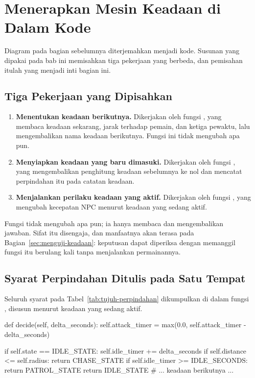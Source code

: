 \section{Menerapkan Mesin Keadaan di Dalam Kode}
\label{sec:menerapkan-fsm}

Diagram pada bagian sebelumnya diterjemahkan menjadi kode. Susunan yang dipakai
pada bab ini memisahkan tiga pekerjaan yang berbeda, dan pemisahan itulah yang
menjadi inti bagian ini.

\subsection{Tiga Pekerjaan yang Dipisahkan}

\begin{enumerate}
  \item \textbf{Menentukan keadaan berikutnya.} Dikerjakan oleh fungsi
        , yang membaca keadaan sekarang, jarak terhadap pemain,
        dan ketiga pewaktu, lalu mengembalikan nama keadaan berikutnya. Fungsi
        ini tidak mengubah apa pun.
  \item \textbf{Menyiapkan keadaan yang baru dimasuki.} Dikerjakan oleh fungsi
        , yang mengembalikan penghitung keadaan sebelumnya ke
        nol dan mencatat perpindahan itu pada catatan keadaan.
  \item \textbf{Menjalankan perilaku keadaan yang aktif.} Dikerjakan oleh fungsi
        , yang mengubah kecepatan NPC menurut keadaan yang sedang
        aktif.
\end{enumerate}

Fungsi  tidak mengubah apa pun; ia hanya membaca
dan mengembalikan jawaban. Sifat itu disengaja, dan manfaatnya akan terasa pada
Bagian~\ref{sec:menguji-keadaan}: keputusan dapat diperiksa dengan memanggil
fungsi itu berulang kali tanpa menjalankan permainannya.

\subsection{Syarat Perpindahan Ditulis pada Satu Tempat}

Seluruh syarat pada Tabel~\ref{tab:tujuh-perpindahan} dikumpulkan di dalam
fungsi , disusun menurut keadaan yang sedang aktif.

\begin{kodekeluaran}
def decide(self, delta_seconds):
    self.attack_timer = max(0.0, self.attack_timer - delta_seconds)

    if self.state == IDLE_STATE:
        self.idle_timer += delta_seconds
        if self.distance <= self.radius:
            return CHASE_STATE
        if self.idle_timer >= IDLE_SECONDS:
            return PATROL_STATE
        return IDLE_STATE
    # ... keadaan berikutnya ...
\end{kodekeluaran}

